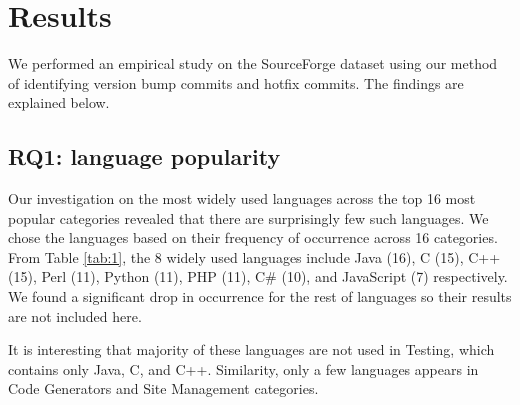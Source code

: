 \documentclass{sig-alternate}
\begin{document}
\section{Results}
We performed an empirical study on the SourceForge dataset using our method of identifying version bump commits and hotfix commits. The findings are explained below.
\subsection{RQ1: language popularity}
Our investigation on the most widely used languages across the top 16 most popular categories revealed that there are surprisingly few such languages. We chose the languages based on their frequency of occurrence across 16 categories. From Table \ref{tab:1}, the 8 widely used languages include Java (16), C (15), C++ (15), Perl (11), Python (11), PHP (11), C\# (10), and JavaScript (7) respectively.  We found a significant drop in occurrence for the rest of languages so their results are not included here.  %

It is interesting that majority of these languages are not used in Testing, which contains only Java, C, and C++. Similarity, only a few languages appears in Code Generators and Site Management categories.

\end{document}
